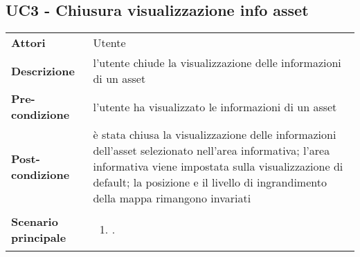 \subsection{UC3 - Chiusura visualizzazione info asset} 
\label{sssec:UC3} 
\def\arraystretch{1.5}
\begin{tabularx}{\textwidth}{l|p{}}
	\rowcolor{I} \multicolumn{2}{c}{\color{white}\textbf{UC3 - Chiusura visualizzazione info asset}} \\
	\toprule
	\endhead
	\textbf{Attori} & Utente\\
	\textbf{Descrizione} & l'utente chiude la visualizzazione delle informazioni di un asset\\
	\textbf{Pre-condizione} & l'utente ha visualizzato le informazioni di un asset\\
	\textbf{Post-condizione} & è stata chiusa la visualizzazione delle informazioni dell'asset selezionato nell'area informativa; l'area informativa viene impostata sulla visualizzazione di default; la posizione e il livello di ingrandimento della mappa rimangono invariati\\
	\textbf{Scenario principale} & \vspace{-1.2em}\begin{enumerate}[leftmargin=*,noitemsep,nosep]
		\item \nameref{sssec:UC3}.
	\end{enumerate}\\
	\bottomrule
\end{tabularx}

